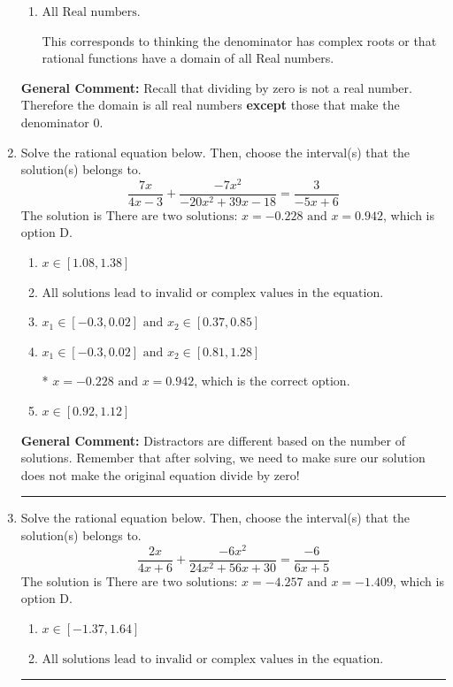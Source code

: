 \documentclass{extbook}[14pt]
\newcommand{\litem}[1]{\item #1

\rule{\textwidth}{0.4pt}}
\begin{document}
\begin{enumerate}
{\begin{enumerate}[label=\Alph*.]
All Real numbers except $x = -2.000$ and $x = -1.250$, which is the correct option.
\item \( \text{All Real numbers.} \)

This corresponds to thinking the denominator has complex roots or that rational functions have a domain of all Real numbers.
\end{enumerate}

\textbf{General Comment:} Recall that dividing by zero is not a real number. Therefore the domain is all real numbers \textbf{except} those that make the denominator 0.
}
\litem{
Solve the rational equation below. Then, choose the interval(s) that the solution(s) belongs to.
\[ \frac{7x}{4x -3} + \frac{-7x^{2}}{-20x^{2} +39 x -18} = \frac{3}{-5x + 6} \]The solution is \( \text{There are two solutions: } x = -0.228 \text{ and } x = 0.942 \), which is option D.\begin{enumerate}[label=\Alph*.]
\item \( x \in [1.08,1.38] \)


\item \( \text{All solutions lead to invalid or complex values in the equation.} \)


\item \( x_1 \in [-0.3, 0.02] \text{ and } x_2 \in [0.37,0.85] \)


\item \( x_1 \in [-0.3, 0.02] \text{ and } x_2 \in [0.81,1.28] \)

* $x = -0.228 \text{ and } x = 0.942$, which is the correct option.
\item \( x \in [0.92,1.12] \)


\end{enumerate}

\textbf{General Comment:} Distractors are different based on the number of solutions. Remember that after solving, we need to make sure our solution does not make the original equation divide by zero!
}
\litem{
Solve the rational equation below. Then, choose the interval(s) that the solution(s) belongs to.
\[ \frac{2x}{4x + 6} + \frac{-6x^{2}}{24x^{2} +56 x + 30} = \frac{-6}{6x + 5} \]The solution is \( \text{There are two solutions: } x = -4.257 \text{ and } x = -1.409 \), which is option D.\begin{enumerate}[label=\Alph*.]
\item \( x \in [-1.37,1.64] \)


\item \( \text{All solutions lead to invalid or complex values in the equation.} \)



\end{enumerate}}
\end{enumerate}
\end{document}
